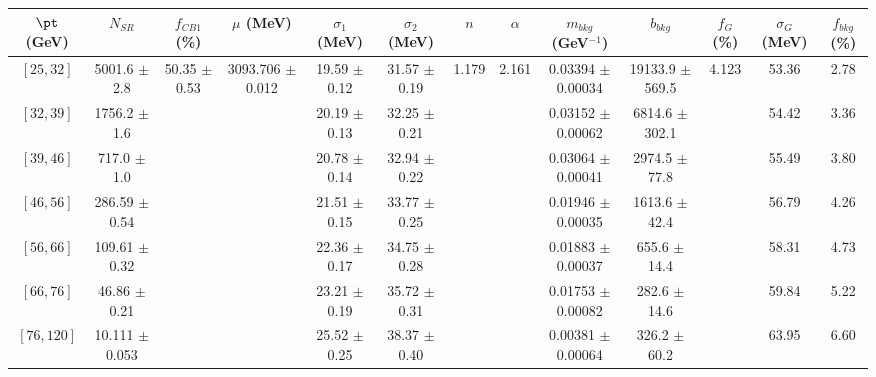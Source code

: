 \begin{tabular}{c||c|c|c|c|c|c|c|c|c|c|c||c}
$\pt$ (GeV) & $N_{SR}$ & $f_{CB1}$ (\%) & $\mu$ (MeV) & $\sigma_1$ (MeV) & $\sigma_2$ (MeV) & $n$ & $\alpha$ & $m_{bkg}$ (GeV$^{-1}$) & $b_{bkg}$ & $f_G$ (\%) & $\sigma_G$ (MeV) & $f_{bkg}$ (\%) \\
\hline
$[25, 32]$ & 5001.6 $\pm$ 2.8 & \multirow{7}{*}{50.35 $\pm$ 0.53} & \multirow{7}{*}{3093.706 $\pm$ 0.012} & 19.59 $\pm$ 0.12 & 31.57 $\pm$ 0.19 & \multirow{7}{*}{1.179} & \multirow{7}{*}{2.161} & 0.03394 $\pm$ 0.00034 & 19133.9 $\pm$ 569.5 & \multirow{7}{*}{4.123} & 53.36 & 2.78\\
$[32, 39]$ & 1756.2 $\pm$ 1.6 &  &  & 20.19 $\pm$ 0.13 & 32.25 $\pm$ 0.21 &  &  & 0.03152 $\pm$ 0.00062 & 6814.6 $\pm$ 302.1 &  & 54.42 & 3.36\\
$[39, 46]$ & 717.0 $\pm$ 1.0 &  &  & 20.78 $\pm$ 0.14 & 32.94 $\pm$ 0.22 &  &  & 0.03064 $\pm$ 0.00041 & 2974.5 $\pm$ 77.8 &  & 55.49 & 3.80\\
$[46, 56]$ & 286.59 $\pm$ 0.54 &  &  & 21.51 $\pm$ 0.15 & 33.77 $\pm$ 0.25 &  &  & 0.01946 $\pm$ 0.00035 & 1613.6 $\pm$ 42.4 &  & 56.79 & 4.26\\
$[56, 66]$ & 109.61 $\pm$ 0.32 &  &  & 22.36 $\pm$ 0.17 & 34.75 $\pm$ 0.28 &  &  & 0.01883 $\pm$ 0.00037 & 655.6 $\pm$ 14.4 &  & 58.31 & 4.73\\
$[66, 76]$ & 46.86 $\pm$ 0.21 &  &  & 23.21 $\pm$ 0.19 & 35.72 $\pm$ 0.31 &  &  & 0.01753 $\pm$ 0.00082 & 282.6 $\pm$ 14.6 &  & 59.84 & 5.22\\
$[76, 120]$ & 10.111 $\pm$ 0.053 &  &  & 25.52 $\pm$ 0.25 & 38.37 $\pm$ 0.40 &  &  & 0.00381 $\pm$ 0.00064 & 326.2 $\pm$ 60.2 &  & 63.95 & 6.60\\
\end{tabular}
